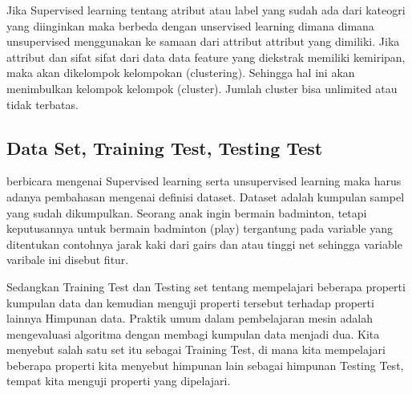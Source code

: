 \hspace{1cm} Jika Supervised learning tentang atribut atau label yang sudah ada dari kateogri yang diinginkan maka berbeda dengan unservised learning dimana dimana unsupervised menggunakan ke samaan dari attribut attribut yang dimiliki. Jika attribut dan sifat sifat dari data data feature yang diekstrak memiliki kemiripan, maka akan dikelompok kelompokan (clustering). Sehingga hal ini akan menimbulkan kelompok kelompok (cluster). Jumlah cluster bisa unlimited atau tidak terbatas.

\subsection{Data Set, Training Test, Testing Test}
\hspace{1cm} berbicara mengenai Supervised learning serta unsupervised learning maka harus adanya pembahasan mengenai definisi dataset. Dataset adalah kumpulan sampel yang sudah dikumpulkan. Seorang anak ingin bermain badminton, tetapi keputusannya untuk bermain badminton (play) tergantung pada variable yang ditentukan contohnya jarak kaki dari gairs dan atau tinggi net sehingga variable varibale ini disebut fitur.

\hspace{1cm} Sedangkan Training Test dan Testing set tentang mempelajari beberapa properti kumpulan data dan kemudian menguji properti tersebut terhadap properti lainnya Himpunan data. Praktik umum dalam pembelajaran mesin adalah mengevaluasi algoritma dengan membagi kumpulan data menjadi dua. Kita menyebut salah satu set itu sebagai Training Test, di mana kita mempelajari beberapa properti kita menyebut himpunan lain sebagai himpunan Testing Test, tempat kita menguji properti yang dipelajari.


